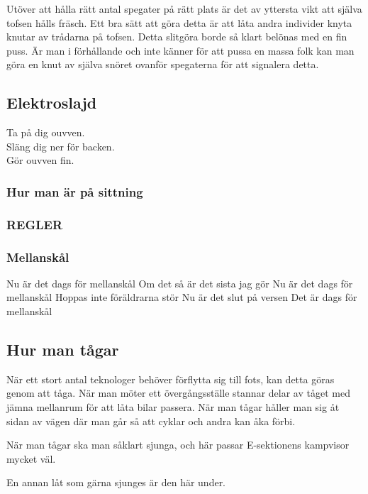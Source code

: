 Utöver att hålla rätt antal spegater på rätt plats är det av yttersta vikt att själva tofsen hålls fräsch. Ett bra sätt att göra detta är att låta andra individer knyta knutar av trådarna på tofsen. Detta slitgöra borde så klart belönas med en fin puss.
Är man i förhållande och inte känner för att pussa en massa folk kan man göra en knut av själva snöret ovanför spegaterna för att signalera detta.
\\

\subsection*{Elektroslajd}
Ta på dig ouvven.\\
Släng dig ner för backen.\\
Gör ouvven fin.

\newpage


\subsubsection*{Hur man är på sittning}
\subsubsection*{REGLER}

\subsubsection*{Mellanskål}

Nu är det dags för mellanskål
Om det så är det sista jag gör
Nu är det dags för mellanskål
Hoppas inte föräldrarna stör
Nu är det slut på versen 
Det är dags för mellanskål

\newpage

\subsection*{Hur man tågar}

När ett stort antal teknologer behöver förflytta sig till fots, kan detta göras genom att tåga. 
När man möter ett övergångsställe stannar delar av tåget med jämna mellanrum för att låta bilar passera.
När man tågar håller man sig åt sidan av vägen där man går så att cyklar och andra kan åka förbi.

När man tågar ska man såklart sjunga, och här passar E-sektionens kampvisor mycket väl.

En annan låt som gärna sjunges är den här under. 

